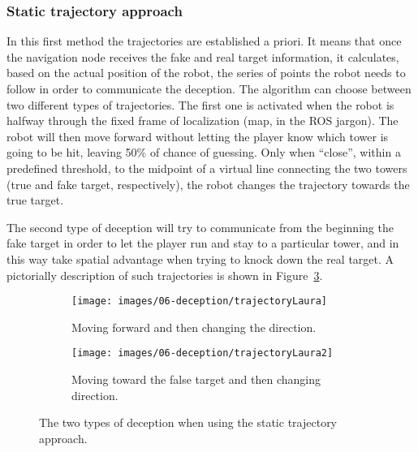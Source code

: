 \subsubsection{Static trajectory approach}
In this first method the trajectories are established a priori. It means that once the navigation node receives the fake and real target information, it calculates, based on the actual position of the robot, the series of points the robot needs to follow in order to communicate the deception.
The algorithm can choose between two different types of trajectories. The first one is activated when the robot is halfway through %
the fixed frame of localization (map, in the ROS jargon). The robot will then move forward without letting the player know which tower is going to be hit, leaving 50\% of chance of guessing. Only when ``close'', within a predefined threshold, to the midpoint of a virtual line connecting the two towers (true and fake target, respectively), the robot changes the trajectory towards the true target.

The second type of deception will try to communicate from the beginning the fake target in order to let the player run and stay to a particular tower, and in this way take spatial advantage when trying to knock down the real target. A pictorially description of such trajectories is shown in Figure~\ref{fig::trajectoryStatic}.

\begin{figure}[h]
    \centering
    \begin{subfigure}[t]{0.45\columnwidth}
        \centering
        \texttt{[image: images/06-deception/trajectoryLaura]}
        \caption{Moving forward and then changing the direction.}
        \label{fig:1}
    \end{subfigure}
    \hspace{0.01\columnwidth}
    \begin{subfigure}[t]{0.45\columnwidth}
        \centering
        \texttt{[image: images/06-deception/trajectoryLaura2]}
        \caption{Moving toward the false target and then changing direction.}
        \label{fig:2}
    \end{subfigure}
    \caption{The two types of deception when using the static trajectory approach.}
    \label{fig::trajectoryStatic}
\end{figure}


